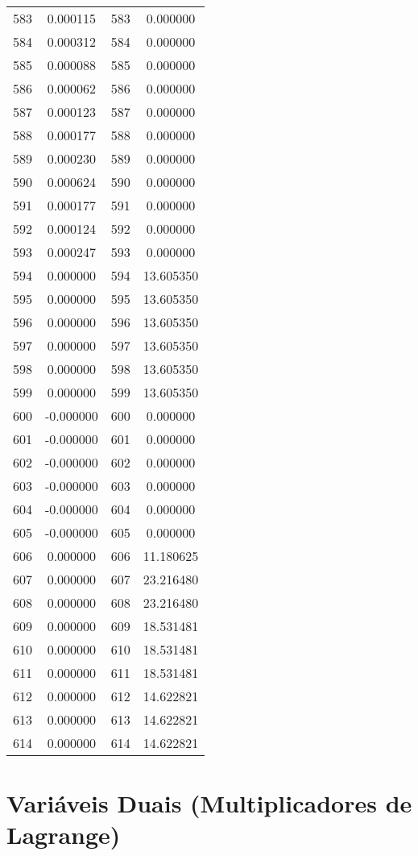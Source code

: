 \documentclass[12pt]{article}
\begin{document}
\begin{longtable}{@{}cccc@{}}
583 & 0.000115 & 583 & 0.000000 \\
584 & 0.000312 & 584 & 0.000000 \\
585 & 0.000088 & 585 & 0.000000 \\
586 & 0.000062 & 586 & 0.000000 \\
587 & 0.000123 & 587 & 0.000000 \\
588 & 0.000177 & 588 & 0.000000 \\
589 & 0.000230 & 589 & 0.000000 \\
590 & 0.000624 & 590 & 0.000000 \\
591 & 0.000177 & 591 & 0.000000 \\
592 & 0.000124 & 592 & 0.000000 \\
593 & 0.000247 & 593 & 0.000000 \\
594 & 0.000000 & 594 & 13.605350 \\
595 & 0.000000 & 595 & 13.605350 \\
596 & 0.000000 & 596 & 13.605350 \\
597 & 0.000000 & 597 & 13.605350 \\
598 & 0.000000 & 598 & 13.605350 \\
599 & 0.000000 & 599 & 13.605350 \\
600 & -0.000000 & 600 & 0.000000 \\
601 & -0.000000 & 601 & 0.000000 \\
602 & -0.000000 & 602 & 0.000000 \\
603 & -0.000000 & 603 & 0.000000 \\
604 & -0.000000 & 604 & 0.000000 \\
605 & -0.000000 & 605 & 0.000000 \\
606 & 0.000000 & 606 & 11.180625 \\
607 & 0.000000 & 607 & 23.216480 \\
608 & 0.000000 & 608 & 23.216480 \\
609 & 0.000000 & 609 & 18.531481 \\
610 & 0.000000 & 610 & 18.531481 \\
611 & 0.000000 & 611 & 18.531481 \\
612 & 0.000000 & 612 & 14.622821 \\
613 & 0.000000 & 613 & 14.622821 \\
614 & 0.000000 & 614 & 14.622821 \\

\end{longtable}

\section{Variáveis Duais (Multiplicadores de Lagrange)}
\end{document}
